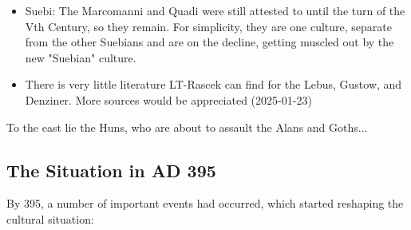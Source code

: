 \documentclass{article}
\begin{document}
\begin{itemize}
		\item Suebi:
		The Marcomanni and Quadi were still attested to until the turn of the Vth Century, so they remain. 
		For simplicity, they are one culture, separate from the other Suebians and are on the decline, getting muscled out by the new "Suebian" culture.
		
		\item There is very little literature LT-Rascek can find for the Lebus, Gustow, and Denziner.
		More sources would be appreciated (2025-01-23)
	\end{itemize}
	
	To the east lie the Huns, who are about to assault the Alans and Goths...
	
	\newpage
	\subsection{The Situation in AD 395}
	\label{sec:timeline:subsec:395}
	By 395, a number of important events had occurred, which started reshaping the cultural situation:
	
\end{document}
